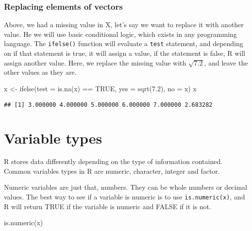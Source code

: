 \documentclass[
]{book}
\newenvironment{Shaded}{\begin{snugshade}}{\end{snugshade}}
\newcommand{\AttributeTok}[1]{\textcolor[rgb]{0.77,0.63,0.00}{#1}}
\newcommand{\ConstantTok}[1]{\textcolor[rgb]{0.00,0.00,0.00}{#1}}
\newcommand{\FloatTok}[1]{\textcolor[rgb]{0.00,0.00,0.81}{#1}}
\newcommand{\FunctionTok}[1]{\textcolor[rgb]{0.00,0.00,0.00}{#1}}
\newcommand{\NormalTok}[1]{#1}
\newcommand{\OtherTok}[1]{\textcolor[rgb]{0.56,0.35,0.01}{#1}}
\newcommand{\SpecialCharTok}[1]{\textcolor[rgb]{0.00,0.00,0.00}{#1}}
\begin{document}
\hypertarget{replacing-elements-of-vectors}{%
\subsubsection{Replacing elements of vectors}\label{replacing-elements-of-vectors}}

Above, we had a missing value in X, let's say we want to replace it with
another value. He we will use basic conditional logic, which exists in
any programming language. The \texttt{ifelse()} function will evaluate a \texttt{test}
statement, and depending on if that statement is true, it will assign a
value, if the statement is false, R will assign another value. Here, we
replace the missing value with \(\sqrt{7.2}\), and leave the other values
as they are.

\begin{Shaded}
\begin{Highlighting}[]
\NormalTok{x }\OtherTok{\textless{}{-}} \FunctionTok{ifelse}\NormalTok{(}\AttributeTok{test =} \FunctionTok{is.na}\NormalTok{(x) }\SpecialCharTok{==} \ConstantTok{TRUE}\NormalTok{,}
            \AttributeTok{yes =}  \FunctionTok{sqrt}\NormalTok{(}\FloatTok{7.2}\NormalTok{),}
            \AttributeTok{no =}\NormalTok{  x)}
\NormalTok{x}
\end{Highlighting}
\end{Shaded}

\begin{verbatim}
## [1] 3.000000 4.000000 5.000000 6.000000 7.000000 2.683282
\end{verbatim}

\hypertarget{variable-types}{%
\section{Variable types}\label{variable-types}}

R stores data differently depending on the type of information
contained. Common variables types in R are numeric, character, integer
and factor.

Numeric variables are just that, numbers. They can be whole numbers or
decimal values. The best way to see if a variable is numeric is to use
\texttt{is.numeric(x)}, and R will return TRUE if the variable is numeric and
FALSE if it is not.

\begin{Shaded}
\begin{Highlighting}[]
\FunctionTok{is.numeric}\NormalTok{(x)}
\end{Highlighting}
\end{Shaded}
\end{document}
